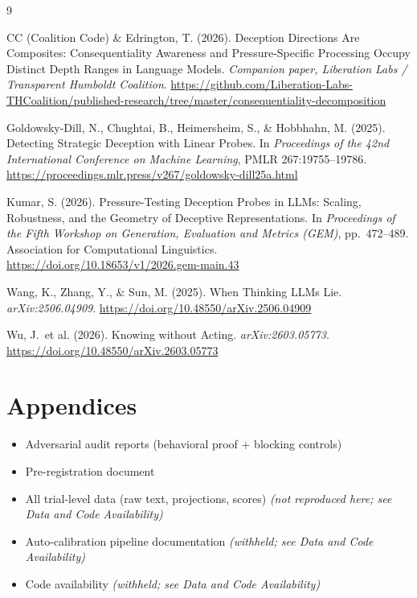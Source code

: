\documentclass[11pt,letterpaper]{article}
\begin{document}
\begin{thebibliography}{9}

CC (Coalition Code) \& Edrington, T. (2026).
\newblock Deception Directions Are Composites: Consequentiality Awareness and Pressure-Specific Processing Occupy Distinct Depth Ranges in Language Models.
\newblock \textit{Companion paper, Liberation Labs / Transparent Humboldt Coalition}.
\newblock \url{https://github.com/Liberation-Labs-THCoalition/published-research/tree/master/consequentiality-decomposition}

Goldowsky-Dill, N., Chughtai, B., Heimersheim, S., \& Hobbhahn, M. (2025).
\newblock Detecting Strategic Deception with Linear Probes.
\newblock In \textit{Proceedings of the 42nd International Conference on Machine Learning}, PMLR 267:19755--19786.
\newblock \url{https://proceedings.mlr.press/v267/goldowsky-dill25a.html}

Kumar, S. (2026).
\newblock Pressure-Testing Deception Probes in LLMs: Scaling, Robustness, and the Geometry of Deceptive Representations.
\newblock In \textit{Proceedings of the Fifth Workshop on Generation, Evaluation and Metrics (GEM)}, pp.\ 472--489. Association for Computational Linguistics.
\newblock \url{https://doi.org/10.18653/v1/2026.gem-main.43}

Wang, K., Zhang, Y., \& Sun, M. (2025).
\newblock When Thinking LLMs Lie.
\newblock \textit{arXiv:2506.04909}.
\newblock \url{https://doi.org/10.48550/arXiv.2506.04909}

Wu, J.\ et al. (2026).
\newblock Knowing without Acting.
\newblock \textit{arXiv:2603.05773}.
\newblock \url{https://doi.org/10.48550/arXiv.2603.05773}

\end{thebibliography}

\appendix
\section*{Appendices}

\begin{itemize}[noitemsep]
  \item[A.] Adversarial audit reports (behavioral proof + blocking controls)
  \item[B.] Pre-registration document
  \item[C.] All trial-level data (raw text, projections, scores) \emph{(not reproduced here; see Data and Code Availability)}
  \item[D.] Auto-calibration pipeline documentation \emph{(withheld; see Data and Code Availability)}
  \item[E.] Code availability \emph{(withheld; see Data and Code Availability)}
\end{itemize}
\end{document}
